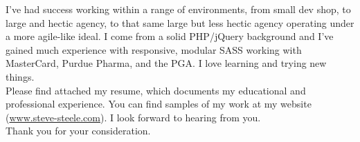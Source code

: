 \documentclass[11pt]{ncsuthesis4}
\newcommand{\tab}{\hspace*{20em}}
\begin{document}
\noindent
I've had success working within a range of environments, from small dev shop, to large and hectic agency, to that same large but less hectic agency operating under a more agile-like ideal. I come from a solid PHP/jQuery background and I've gained much experience with responsive, modular SASS working with MasterCard, Purdue Pharma, and the PGA. I love learning and trying new things.
\\

\noindent Please find attached my resume, which documents my educational and professional experience. You can find samples of my work at my website (\href{http://www.steve-steele.com}{www.steve-steele.com}). I look forward to hearing from you.
\\

\noindent Thank you for your consideration.
\\

\tab{Sincerely,}

\tab{Steve Steele}




\nocite{*}
\end{document}
